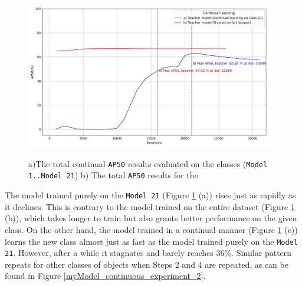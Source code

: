 \begin{figure}[htb]
	\begin{center}
		\includegraphics[width=14cm]{./AP50_continual_21_allClasses.jpg}
	\end{center}
	\caption{a)The total continual \texttt{AP50} results evaluated on the classes (\texttt{Model 1..Model 21}) b) The total \texttt{AP50} results for the }
	\begin{center}
	\label{myModel_continuous_experiment_3}
	\end{center}
\end{figure}
\FloatBarrier 

The model trained purely on the \texttt{Model 21} (Figure \ref{myModel_continuous_experiment_3} (a))  rises just as rapidly as it declines. This is contrary to the model trained on the entire dataset (Figure \ref{myModel_continuous_experiment_3} (b)), which takes longer to train but also grants better performance on the given class. On the other hand, the model trained in a continual manner (Figure \ref{myModel_continuous_experiment_3} (c)) learns the new class almost just as fast as the model trained purely on the \texttt{Model 21}. However, after a while it stagnates and barely reaches 36\%. Similar pattern repeats for other classes of objects when Steps 2 and 4 are repeated, as can be found in Figure \ref{myModel_continuous_experiment_2}.

